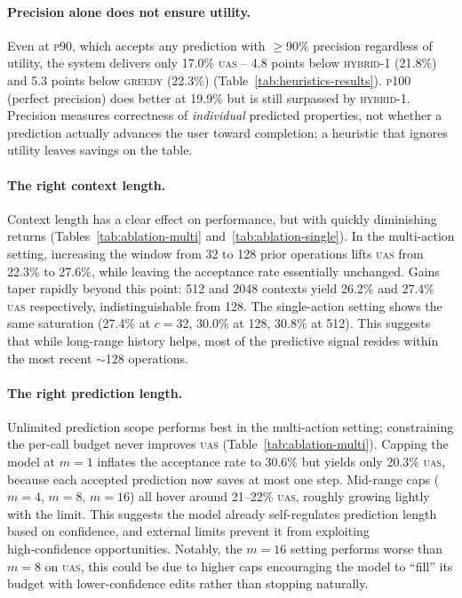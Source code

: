 \documentclass{article}
\theoremstyle{plain}
\theoremstyle{definition}
\theoremstyle{remark}
\begin{document}
\paragraph{Precision alone does not ensure utility.}

Even at \textsc{p90}, which accepts any prediction with $\geq 90\%$ precision regardless of utility, the system delivers only 17.0\% \textsc{uas} -- 4.8 points below \textsc{hybrid-1} (21.8\%) and 5.3 points below \textsc{greedy} (22.3\%) (Table~\ref{tab:heuristics-results}).
\textsc{p100} (perfect precision) does better at 19.9\% but is still surpassed by \textsc{hybrid-1}.
Precision measures correctness of \emph{individual} predicted properties, not whether a prediction actually advances the user toward completion; a heuristic that ignores utility leaves savings on the table.


\paragraph{The right context length.}

Context length has a clear effect on performance, but with quickly diminishing returns (Tables~\ref{tab:ablation-multi} and~\ref{tab:ablation-single}).
In the multi-action setting, increasing the window from 32 to 128 prior operations lifts \textsc{uas} from 22.3\% to 27.6\%, while leaving the acceptance rate essentially unchanged.
Gains taper rapidly beyond this point: 512 and 2048 contexts yield 26.2\% and 27.4\% \textsc{uas} respectively, indistinguishable from 128.
The single-action setting shows the same saturation (27.4\% at $c{=}32$, 30.0\% at 128, 30.8\% at 512).
This suggests that while long-range history helps, most of the predictive signal resides within the most recent $\sim$128 operations.



\paragraph{The right prediction length.}
Unlimited prediction scope performs best in the multi-action setting; constraining the per-call budget never improves \textsc{uas} (Table~\ref{tab:ablation-multi}).
Capping the model at $m{=}1$ inflates the acceptance rate to 30.6\% but yields only 20.3\% \textsc{uas}, because each accepted prediction now saves at most one step.
Mid-range caps ($m{=}4$, $m{=}8$, $m{=}16$) all hover around 21--22\% \textsc{uas}, roughly growing lightly with the limit.
This suggests the model already self-regulates prediction length based on confidence, and external limits prevent it from exploiting high‑confidence opportunities. Notably, the $m=16$ setting performs worse than $m=8$ on \textsc{uas}, this could be due to higher caps encouraging the model to “fill” its budget with lower-confidence edits rather than stopping naturally.
\end{document}
